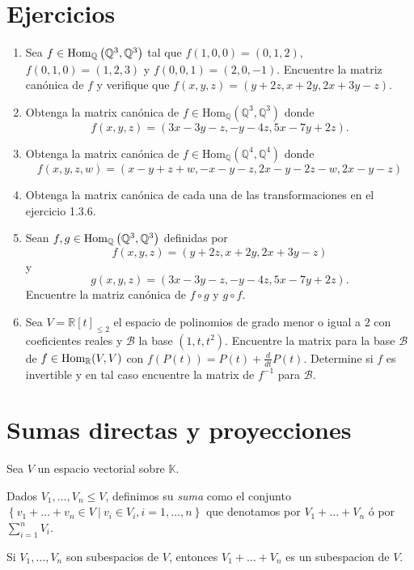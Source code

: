 \section*{Ejercicios}
\begin{enumerate}
  \item Sea $f\in\operatorname{Hom}_{\mathbb{Q}}\left(\mathbb{Q}^3,\mathbb{Q}^3\right)$ tal que $f(1,0,0)=(0,1,2)$, $f(0,1,0)=(1,2,3)$ y $f(0,0,1)=(2,0,-1)$. Encuentre la matriz canónica de $f$ y verifique que $f(x,y,z)=(y+2z,x+2y,2x+3y-z)$.
  \item Obtenga la matrix canónica de $f\in\textrm{Hom}_{\mathbb{Q}}(\mathbb{Q}^3,\mathbb{Q}^3)$ donde
$$f(x,y,z)=(3x-3y-z,-y-4z,5x-7y+2z).$$
  \item Obtenga la matrix canónica de $f\in\textrm{Hom}_{\mathbb{Q}}(\mathbb{Q}^4,\mathbb{Q}^4)$ donde
$$f(x,y,z,w)=(x-y+z+w,-x-y-z,2x-y-2z-w,2x-y-z)$$
  \item Obtenga la matrix canónica de cada una de las transformaciones en el ejercicio 1.3.6.
  \item Sean $f,g\in\operatorname{Hom}_{\mathbb{Q}}\left(\mathbb{Q}^3,\mathbb{Q}^3\right)$ definidas por
  $$f(x,y,z)=(y+2z,x+2y,2x+3y-z)$$
  y
  $$g(x,y,z)=(3x-3y-z,-y-4z,5x-7y+2z).$$
  Encuentre la matriz canónica de $f\circ g$ y $g\circ f$.
  \item Sea $V=\mathbb{R}[t]_{\le 2}$ el espacio de polinomios de grado menor o igual a $2$ con coeficientes reales y $\mathcal{B}$ la base $(1,t,t^2)$. Encuentre la matrix para la base $\mathcal{B}$ de $f\in\operatorname{Hom}_{\mathbb{R}}(V,V)$ con $f(P(t))=P(t)+\frac{d}{dt}P(t)$. Determine si $f$ es invertible y en tal caso encuentre la matrix de $f^{-1}$ para $\mathcal{B}$.
\end{enumerate}

\section{Sumas directas y proyecciones}

Sea $V$ un espacio vectorial sobre $\mathbb{K}$.

\begin{defn}
Dados $V_1,\ldots,V_n\le V$, definimos su \emph{suma} como el conjunto $\left\{v_1+\ldots+v_n\in V\ |\ v_i\in V_i, i=1,\ldots,n \right\}$ que denotamos por $V_1+\ldots+V_n$ \'o por $\sum_{i=1}^n V_i$.
\end{defn}

\begin{prop}
Si $V_1,\ldots,V_n$ son subespacios de $V$, entonces $V_1+\ldots+V_n$ es un subespacion de $V$.
\end{prop}

